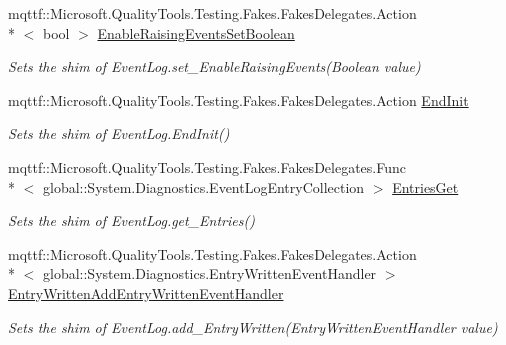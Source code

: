 \begin{DoxyCompactItemize}
mqttf\-::\-Microsoft.\-Quality\-Tools.\-Testing.\-Fakes.\-Fakes\-Delegates.\-Action\\*
$<$ bool $>$ \hyperlink{class_system_1_1_diagnostics_1_1_fakes_1_1_shim_event_log_a6acbcd5f6b3f8d137733f94f17240225}{Enable\-Raising\-Events\-Set\-Boolean}
\begin{DoxyCompactList}\small\item\em Sets the shim of Event\-Log.\-set\-\_\-\-Enable\-Raising\-Events(\-Boolean value)\end{DoxyCompactList}\item 
mqttf\-::\-Microsoft.\-Quality\-Tools.\-Testing.\-Fakes.\-Fakes\-Delegates.\-Action \hyperlink{class_system_1_1_diagnostics_1_1_fakes_1_1_shim_event_log_a95442a40f9c02c70875f2b2199143b9a}{End\-Init}
\begin{DoxyCompactList}\small\item\em Sets the shim of Event\-Log.\-End\-Init()\end{DoxyCompactList}\item 
mqttf\-::\-Microsoft.\-Quality\-Tools.\-Testing.\-Fakes.\-Fakes\-Delegates.\-Func\\*
$<$ global\-::\-System.\-Diagnostics.\-Event\-Log\-Entry\-Collection $>$ \hyperlink{class_system_1_1_diagnostics_1_1_fakes_1_1_shim_event_log_a5461a37e823bf3c5d2197ebaa567fcb9}{Entries\-Get}
\begin{DoxyCompactList}\small\item\em Sets the shim of Event\-Log.\-get\-\_\-\-Entries()\end{DoxyCompactList}\item 
mqttf\-::\-Microsoft.\-Quality\-Tools.\-Testing.\-Fakes.\-Fakes\-Delegates.\-Action\\*
$<$ global\-::\-System.\-Diagnostics.\-Entry\-Written\-Event\-Handler $>$ \hyperlink{class_system_1_1_diagnostics_1_1_fakes_1_1_shim_event_log_abab641197e70026b754e18f6078f5318}{Entry\-Written\-Add\-Entry\-Written\-Event\-Handler}
\begin{DoxyCompactList}\small\item\em Sets the shim of Event\-Log.\-add\-\_\-\-Entry\-Written(\-Entry\-Written\-Event\-Handler value)\end{DoxyCompactList}\item 

\end{DoxyCompactItemize}
